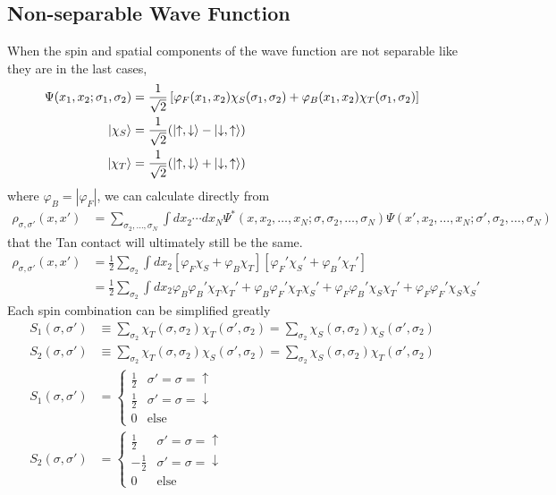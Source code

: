 \documentclass[onecolumn,english,aps,pra]{revtex4}
\begin{document}
\subsection{Non-separable Wave Function}

When the spin and spatial components of the wave function are not separable like they are in the last cases,
\begin{align}
\Psi(x_1, x_2; \sigma_1, \sigma_2) &= \frac{1}{\sqrt{2}}\left[\varphi_F(x_1, x_2) \chi_S(\sigma_1, \sigma_2) + \varphi_B(x_1,x_2) \chi_T(\sigma_1, \sigma_2)\right]
\label{MixedState}\\
\ket{\chi_S}& = \frac{1}{\sqrt{2}}(\ket{\uparrow, \downarrow} - \ket{\downarrow, \uparrow})\nonumber\\
\ket{\chi_T} &= \frac{1}{\sqrt{2}}(\ket{\uparrow, \downarrow} + \ket{\downarrow, \uparrow})\nonumber
\end{align}
where $\varphi_B = |\varphi_F|$, we can calculate directly from 
%
\begin{align*}
\rho_{\sigma, \sigma'}(x, x')& = 
\sum_{\sigma_2, \ldots, \sigma_N} \int dx_2 \cdots dx_N
\Psi^*(x,x_2,\ldots,x_N;\sigma, \sigma_2,\ldots,\sigma_N)
\Psi(x',x_2,\ldots,x_N;\sigma', \sigma_2,\ldots,\sigma_N)
\end{align*}
%
that the Tan contact will ultimately still be the same. 
%
\begin{align}
\rho_{\sigma, \sigma'}(x, x') &= \frac{1}{2}\sum_{\sigma_2} \int dx_2 
\left[ \varphi_F \chi_S + \varphi_B \chi_T\right]
\left[ \varphi_F' \chi_S' + \varphi_B' \chi_T'\right]\nonumber\\
& = \frac{1}{2}\sum_{\sigma_2} \int dx_2 
\varphi_B\varphi_B'\chi_T\chi_T'
+ \varphi_B\varphi_F'\chi_T\chi_S'
+ \varphi_F\varphi_B'\chi_S\chi_T'
+ \varphi_F\varphi_F'\chi_S\chi_S'
\label{MixedOBDMSimp}
\end{align}
%
Each spin combination can be simplified greatly
\begin{align*}
S_{1}(\sigma, \sigma') &\equiv \sum_{\sigma_2}\chi_T(\sigma,\sigma_2)\chi_T(\sigma',\sigma_2) 
= \sum_{\sigma_2}\chi_S(\sigma,\sigma_2)\chi_S(\sigma',\sigma_2)\\
S_{2}(\sigma, \sigma') &\equiv \sum_{\sigma_2}\chi_T(\sigma,\sigma_2)\chi_S(\sigma',\sigma_2) 
= \sum_{\sigma_2}\chi_S(\sigma,\sigma_2)\chi_T(\sigma',\sigma_2)\\
S_{1}(\sigma, \sigma') & =
\begin{cases}
	\frac{1}{2} & \sigma' = \sigma = \uparrow\\
	\frac{1}{2} & \sigma' = \sigma = \downarrow \\
	0 & \text{else}
\end{cases}\\
S_{2}(\sigma, \sigma') & =
\begin{cases}
	\frac{1}{2} & \sigma' = \sigma = \uparrow\\
	-\frac{1}{2} & \sigma' = \sigma = \downarrow \\
	0 & \text{else}
\end{cases}
\end{align*}
\end{document}
